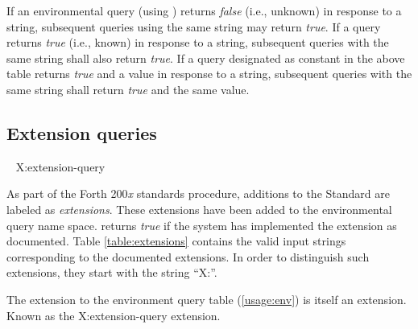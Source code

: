 If an environmental query (using ) returns
\emph{false} (i.e., unknown) in response to a string, subsequent
queries using the same string may return \emph{true}. If a query
returns \emph{true} (i.e., known) in response to a string,
subsequent queries with the same string shall also return
\emph{true}. If a query designated as constant in the above table
returns \emph{true} and a value in response to a string,
subsequent queries with the same string shall return \emph{true}
and the same value.


\subsection{Extension queries} %
\label{usage:extensions}
~ \hfill \textsf{\small X:extension-query}

As part of the Forth 200\emph{x} standards procedure, additions to the
Standard are labeled as \emph{extensions}. These extensions have
been added to the environmental query name space. 
returns \emph{true} if the system has implemented the extension as
documented. Table \ref{table:extensions} contains the valid input
strings corresponding to the documented extensions. In order to
distinguish such extensions, they start with the string
``\textsf{X:}''.

The extension to the environment query table (\ref{usage:env}) is
itself an extension. Known as the \textsf{X:extension-query} extension.

